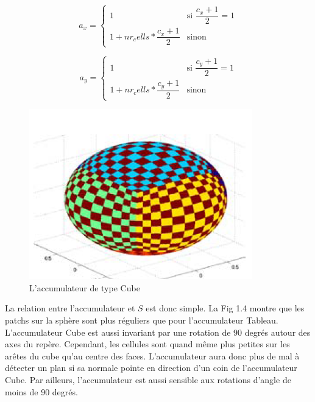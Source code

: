 \documentclass[12pt, twoside]{article}
\begin{document}
\begin{equation*}
  a_x = 
     \begin{cases}
        1 & \text{si $\dfrac{c_x + 1}{2} = 1$} \\
        1 + nr_cells*\dfrac{c_x + 1}{2} & \text{sinon}
     \end{cases}
\end{equation*}

\begin{equation*}
  a_y = 
     \begin{cases}
        1 & \text{si $\dfrac{c_y + 1}{2} = 1$} \\
        1 + nr_cells*\dfrac{c_y + 1}{2} & \text{sinon}
     \end{cases}
\end{equation*}

\begin{figure}[h]
\centering
\includegraphics[scale=0.65]{Cube.png}
\caption{\label{fig:Cube} L'accumulateur de type Cube}
\end{figure}

La relation entre l’accumulateur et $S$ est donc simple. La Fig 1.4 montre que les patchs sur la sphère sont plus réguliers que pour l’accumulateur Tableau. L’accumulateur Cube est aussi invariant par une rotation de 90 degrés autour des axes du repère. Cependant, les cellules sont quand même plus petites sur les arêtes du cube qu’au centre des faces. L’accumulateur aura donc plus de mal à détecter un plan si sa normale pointe en direction d’un coin de l’accumulateur Cube. Par ailleurs, l’accumulateur est aussi sensible aux rotations d’angle de moins de 90 degrés.
\end{document}
